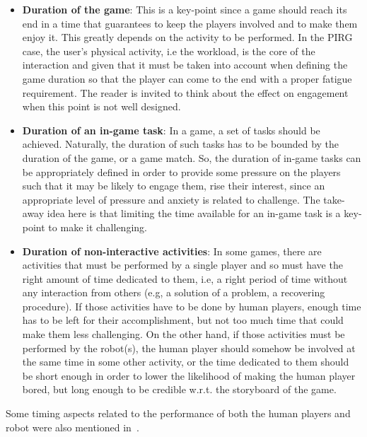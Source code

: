 \begin{itemize}
\item \textbf{Duration of the game}: This is a key-point since a game should reach its end in a time that guarantees to keep the players involved and to make them enjoy it. This greatly depends on the activity to be performed. In the PIRG case, the user's physical activity, i.e the workload, is the core of the interaction and given that it must be taken into account when defining the game duration so that the player can come to the end with a proper fatigue requirement. The reader is invited to think about the effect on engagement when this point is not well designed.

\item \textbf{Duration of an in-game task}: In a game, a set of tasks should be achieved. Naturally, the duration of such tasks has to be bounded by the duration of the game, or a game match. So, the duration of in-game tasks can be appropriately defined in order to provide some pressure on the players such that it may be likely to engage them, rise their interest, since an appropriate level of pressure and anxiety is related to challenge. The take-away idea here is that limiting the time available for an in-game task is a key-point to make it challenging.

\item \textbf{Duration of non-interactive activities}: In some games, there are activities that must be performed by a single player and so must have the right amount of time dedicated to them, i.e, a right period of time without any interaction from others (e.g, a solution of a problem, a recovering procedure). If those activities have to be done by human players, enough time has to be left for their accomplishment, but not too much time that could make them less challenging. On the other hand, if those activities must be performed by the robot(s), the human player should somehow be involved at the same time in some other activity, or the time dedicated to them should be short enough in order to lower the likelihood of making the human player bored, but long enough to be credible w.r.t. the storyboard of the game.
\end{itemize}

Some timing aspects related to the performance of both the human players and robot were also mentioned in~\cite{Bonarini2014}.

